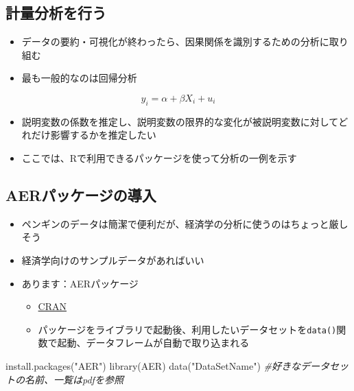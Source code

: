 \documentclass[
]{ltjsarticle}
\newenvironment{Shaded}{\begin{snugshade}}{\end{snugshade}}
\newcommand{\CommentTok}[1]{\textcolor[rgb]{0.56,0.35,0.01}{\textit{#1}}}
\newcommand{\FunctionTok}[1]{\textcolor[rgb]{0.00,0.00,0.00}{#1}}
\newcommand{\NormalTok}[1]{#1}
\newcommand{\StringTok}[1]{\textcolor[rgb]{0.31,0.60,0.02}{#1}}
\providecommand{\tightlist}{%
  \setlength{\itemsep}{0pt}\setlength{\parskip}{0pt}}
\begin{document}
\hypertarget{ux8a08ux91cfux5206ux6790ux3092ux884cux3046}{%
\subsection{計量分析を行う}\label{ux8a08ux91cfux5206ux6790ux3092ux884cux3046}}

\begin{itemize}
\tightlist
\item
  データの要約・可視化が終わったら、因果関係を識別するための分析に取り組む
\item
  最も一般的なのは回帰分析
\end{itemize}

\[y_{i} = \alpha + \beta X_i + u_i\]

\begin{itemize}
\tightlist
\item
  説明変数の係数を推定し、説明変数の限界的な変化が被説明変数に対してどれだけ影響するかを推定したい
\item
  ここでは、Rで利用できるパッケージを使って分析の一例を示す
\end{itemize}

\hypertarget{aerux30d1ux30c3ux30b1ux30fcux30b8ux306eux5c0eux5165}{%
\subsection{AERパッケージの導入}\label{aerux30d1ux30c3ux30b1ux30fcux30b8ux306eux5c0eux5165}}

\begin{itemize}
\tightlist
\item
  ペンギンのデータは簡潔で便利だが、経済学の分析に使うのはちょっと厳しそう
\item
  経済学向けのサンプルデータがあればいい
\item
  あります：AERパッケージ

  \begin{itemize}
  \tightlist
  \item
    \href{https://cran.r-project.org/web/packages/AER/AER.pdf}{CRAN}
  \item
    パッケージをライブラリで起動後、利用したいデータセットを\texttt{data()}関数で起動、データフレームが自動で取り込まれる
  \end{itemize}
\end{itemize}

\begin{Shaded}
\begin{Highlighting}[]
\FunctionTok{install.packages}\NormalTok{(}\StringTok{"AER"}\NormalTok{)}
\FunctionTok{library}\NormalTok{(AER)}
\FunctionTok{data}\NormalTok{(}\StringTok{"DataSetName"}\NormalTok{) }\CommentTok{\#好きなデータセットの名前、一覧はpdfを参照}
\end{Highlighting}
\end{Shaded}
\end{document}
